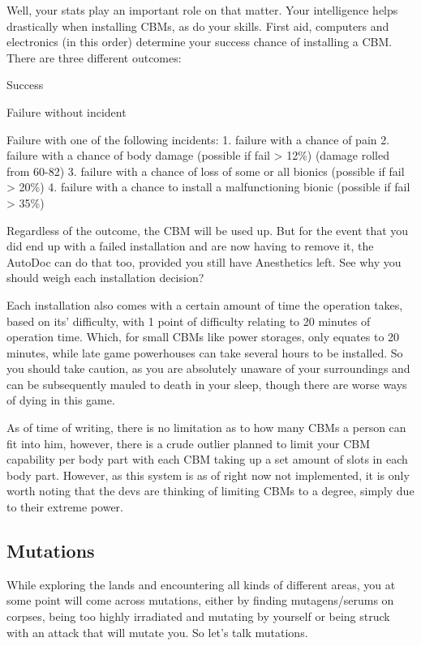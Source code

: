 \documentclass[11pt]{report}
\begin{document}
Well, your stats play an important role on that matter. Your intelligence helps drastically when installing CBMs, as do your skills. First aid, computers and electronics (in this order) determine your success chance of installing a CBM. There are three different outcomes:

Success

Failure without incident

Failure with one of the following incidents:
    1. failure with a chance of pain
    2. failure with a chance of body damage (possible if fail > 12\%) (damage rolled from 60-82)
    3. failure with a chance of loss of some or all bionics (possible if fail > 20\%)
    4. failure with a chance to install a malfunctioning bionic (possible if fail > 35\%)
    
Regardless of the outcome, the CBM will be used up. But for the event that you did end up with a failed installation and are now having to remove it, the AutoDoc can do that too, provided you still have Anesthetics left. See why you should weigh each installation decision?

Each installation also comes with a certain amount of time the operation takes, based on its' difficulty, with 1 point of difficulty relating to 20 minutes of operation time. Which, for small CBMs like power storages, only equates to 20 minutes, while late game powerhouses can take several hours to be installed. So you should take caution, as you are absolutely unaware of your surroundings and can be subsequently mauled to death in your sleep, though there are worse ways of dying in this game.

As of time of writing, there is no limitation as to how many CBMs a person can fit into him, however, there is a crude outlier planned to limit your CBM capability per body part with each CBM taking up a set amount of slots in each body part. However, as this system is as of right now not implemented, it is only worth noting that the devs are thinking of limiting CBMs to a degree, simply due to their extreme power.

\subsection{Mutations}

While exploring the lands and encountering all kinds of different areas, you at some point will come across mutations, either by finding mutagens/serums on corpses, being too highly irradiated and mutating by yourself or being struck with an attack that will mutate you. So let's talk mutations.
\end{document}

